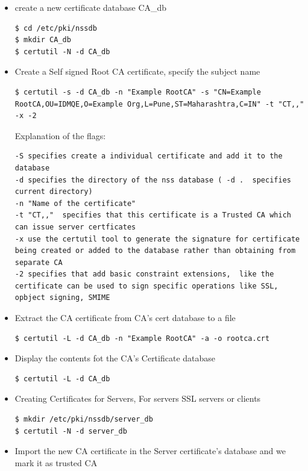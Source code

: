 \documentclass[a4paper]{article}
\begin{document}
\begin{enumerate}[label*=\arabic*.]
\begin{itemize}
            \item create a new certificate database CA\_db
                \begin{lstlisting}[style=BashInputStyle]
$ cd /etc/pki/nssdb
$ mkdir CA_db
$ certutil -N -d CA_db
                \end{lstlisting}
            \item Create a Self signed Root CA certificate, specify the subject name
                \begin{lstlisting}[style=BashInputStyle]
$ certutil -s -d CA_db -n "Example RootCA" -s "CN=Example RootCA,OU=IDMQE,O=Example Org,L=Pune,ST=Maharashtra,C=IN" -t "CT,," -x -2
                \end{lstlisting}
                Explanation of the flags:
                \begin{lstlisting}
-S specifies create a individual certificate and add it to the database
-d specifies the directory of the nss database ( -d .  specifies current directory)
-n "Name of the certificate"
-t "CT,,"  specifies that this certificate is a Trusted CA which can issue server certficates
-x use the certutil tool to generate the signature for certificate being created or added to the database rather than obtaining from separate CA
-2 specifies that add basic constraint extensions,  like the certificate can be used to sign specific operations like SSL, opbject signing, SMIME
                \end{lstlisting}
            \item Extract the CA certificate from CA's cert database to a file
                \begin{lstlisting}[style=BashInputStyle]
$ certutil -L -d CA_db -n "Example RootCA" -a -o rootca.crt
                \end{lstlisting}
            \item Display the contents fot the CA's Certificate database
                \begin{lstlisting}[style=BashInputStyle] 
$ certutil -L -d CA_db
                \end{lstlisting}
            \item Creating Certificates for Servers, For servers SSL servers or clients
                \begin{lstlisting}[style=BashInputStyle]
$ mkdir /etc/pki/nssdb/server_db
$ certutil -N -d server_db
                \end{lstlisting}
            \item Import the new CA certificate in the Server certificate's database and we mark it as trusted CA

\end{itemize}
\end{enumerate}
\end{document}
